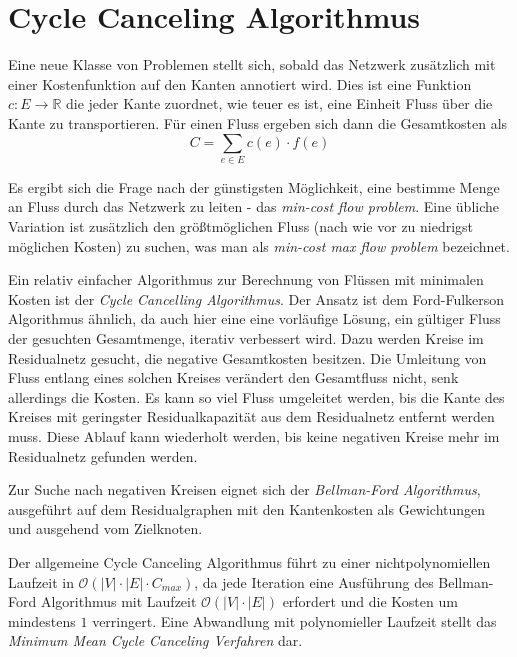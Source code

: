 \section{Cycle Canceling Algorithmus}

Eine neue Klasse von Problemen stellt sich, sobald das Netzwerk zusätzlich mit einer Kostenfunktion auf den Kanten annotiert wird. Dies ist eine Funktion $c: E \rightarrow \mathbb{R}$ die jeder Kante zuordnet, wie teuer es ist, eine Einheit Fluss über die Kante zu transportieren. Für einen Fluss ergeben sich dann die Gesamtkosten als
\[C = \sum_{e \in E} c(e) \cdot f(e)\]

Es ergibt sich die Frage nach der günstigsten Möglichkeit, eine bestimme Menge an Fluss durch das Netzwerk zu leiten - das \emph{min-cost flow problem}. Eine übliche Variation ist zusätzlich den größtmöglichen Fluss (nach wie vor zu niedrigst möglichen Kosten) zu suchen, was man als \emph{min-cost max flow problem} bezeichnet.

Ein relativ einfacher Algorithmus zur Berechnung von Flüssen mit minimalen Kosten ist der \emph{Cycle Cancelling Algorithmus}.\cite{cycle_canceling} Der Ansatz ist dem Ford-Fulkerson Algorithmus ähnlich, da auch hier eine eine vorläufige Lösung, ein gültiger Fluss der gesuchten Gesamtmenge, iterativ verbessert wird. Dazu werden Kreise im Residualnetz gesucht, die negative Gesamtkosten besitzen. Die Umleitung von Fluss entlang eines solchen Kreises verändert den Gesamtfluss nicht, senk allerdings die Kosten. Es kann so viel Fluss umgeleitet werden, bis die Kante des Kreises mit geringster Residualkapazität aus dem Residualnetz entfernt werden muss. Diese Ablauf kann wiederholt werden, bis keine negativen Kreise mehr im Residualnetz gefunden werden.

Zur Suche nach negativen Kreisen eignet sich der \emph{Bellman-Ford Algorithmus}, ausgeführt auf dem Residualgraphen mit den Kantenkosten als Gewichtungen und ausgehend vom Zielknoten. 

Der allgemeine Cycle Canceling Algorithmus führt zu einer nichtpolynomiellen Laufzeit in $\mathcal{O}\left(|V|\cdot |E|\cdot C_{max}\right)$, da jede Iteration eine Ausführung des Bellman-Ford Algorithmus mit Laufzeit $\mathcal{O}\left(|V|\cdot |E|\right)$ erfordert und die Kosten um mindestens $1$ verringert. Eine Abwandlung mit polynomieller Laufzeit stellt das \emph{Minimum Mean Cycle Canceling Verfahren} dar.\cite{min_mean_cycle_canceling}


